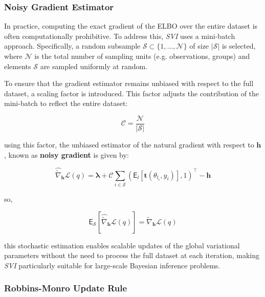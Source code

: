 \subsubsection{Noisy Gradient Estimator}

In practice, computing the exact gradient of the ELBO over the entire dataset is often computationally prohibitive. To address this, \textit{SVI} uses a mini-batch approach. Specifically, a random subsample $ \mathcal{S} \subset \{1, \dots, \mathcal{N}\} $ of size $ |\mathcal{S}|$ is selected, where $\mathcal{N}$ is the total number of sampling units (e.g. observations, groups) and elements $\mathcal{S}$ are sampled uniformly at random. 

\vspace{0.5cm}

To ensure that the gradient estimator remains unbiased with respect to the full dataset, a scaling factor is introduced. This factor adjusts the contribution of the mini-batch to reflect the entire dataset:

\begin{equation}
\mathcal{C} = \frac{\mathcal{N}}{|\mathcal{S}|}
\end{equation}

using this factor, the unbiased estimator of the natural gradient  with respect to $ \bm{h} $, known as \textbf{noisy gradient} is given by:

\begin{equation}
\widehat{\widetilde{\nabla}}_{\bm{h}} \mathcal{L}(q) =\bm{\lambda}+ \mathcal{C} \sum_{i \in \mathcal{S}}(\mathsf{E}_{l}\left[\bm{t}\left(\theta_{l_i},y_i\right)\right],1)^\top - \bm{h}
\end{equation}

so,

\begin{equation}
\mathsf{E}_{\mathcal{S}} \left[ \widehat{\widetilde{\nabla}}_{\bm{h}} \mathcal{L}(q) \right] = \widetilde{\nabla}_{\bm{h}} \mathcal{L}(q)
\end{equation}

this stochastic estimation enables scalable updates of the global variational parameters without the need to process the full dataset at each iteration, making \textit{SVI} particularly suitable for large-scale Bayesian inference problems.

\subsubsection{Robbins-Monro Update Rule}

